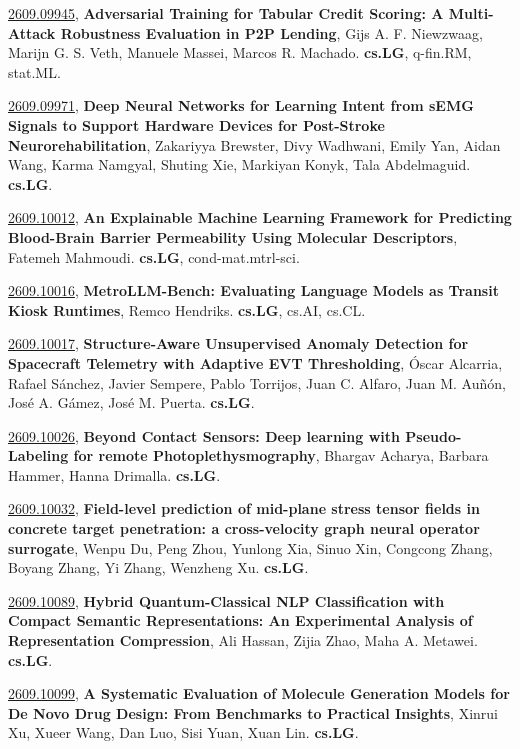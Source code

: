 \documentclass[9pt, a4paper]{article}
\theoremstyle{plain}
\theoremstyle{definition}
\theoremstyle{remark}
\newcommand{\arxivwithtarget}[3]{\hypertarget{#1}{}\href{https://arxiv.org/abs/#1}{#1}, \textbf{\textcolor{arxivblue}{#2}}, #3. }
\begin{document}
\arxivwithtarget{2609.09945}{Adversarial Training for Tabular Credit Scoring: A Multi-Attack Robustness Evaluation in P2P Lending}{Gijs A. F. Niewzwaag, Marijn G. S. Veth, Manuele Massei, Marcos R. Machado}\textbf{cs.LG}, q-fin.RM, stat.ML.



\arxivwithtarget{2609.09971}{Deep Neural Networks for Learning Intent from sEMG Signals to Support Hardware Devices for Post-Stroke Neurorehabilitation}{Zakariyya Brewster, Divy Wadhwani, Emily Yan, Aidan Wang, Karma Namgyal, Shuting Xie, Markiyan Konyk, Tala Abdelmaguid}\textbf{cs.LG}.



\arxivwithtarget{2609.10012}{An Explainable Machine Learning Framework for Predicting Blood-Brain Barrier Permeability Using Molecular Descriptors}{Fatemeh Mahmoudi}\textbf{cs.LG}, cond-mat.mtrl-sci.



\arxivwithtarget{2609.10016}{MetroLLM-Bench: Evaluating Language Models as Transit Kiosk Runtimes}{Remco Hendriks}\textbf{cs.LG}, cs.AI, cs.CL.



\arxivwithtarget{2609.10017}{Structure-Aware Unsupervised Anomaly Detection for Spacecraft Telemetry with Adaptive EVT Thresholding}{Óscar Alcarria, Rafael Sánchez, Javier Sempere, Pablo Torrijos, Juan C. Alfaro, Juan M. Auñón, José A. Gámez, José M. Puerta}\textbf{cs.LG}.



\arxivwithtarget{2609.10026}{Beyond Contact Sensors: Deep learning with Pseudo-Labeling for remote Photoplethysmography}{Bhargav Acharya, Barbara Hammer, Hanna Drimalla}\textbf{cs.LG}.



\arxivwithtarget{2609.10032}{Field-level prediction of mid-plane stress tensor fields in concrete target penetration: a cross-velocity graph neural operator surrogate}{Wenpu Du, Peng Zhou, Yunlong Xia, Sinuo Xin, Congcong Zhang, Boyang Zhang, Yi Zhang, Wenzheng Xu}\textbf{cs.LG}.



\arxivwithtarget{2609.10089}{Hybrid Quantum-Classical NLP Classification with Compact Semantic Representations: An Experimental Analysis of Representation Compression}{Ali Hassan, Zijia Zhao, Maha A. Metawei}\textbf{cs.LG}.



\arxivwithtarget{2609.10099}{A Systematic Evaluation of Molecule Generation Models for De Novo Drug Design: From Benchmarks to Practical Insights}{Xinrui Xu, Xueer Wang, Dan Luo, Sisi Yuan, Xuan Lin}\textbf{cs.LG}.
\end{document}
